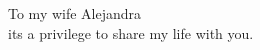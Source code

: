 \thispagestyle{empty}
{}

\vspace*{3cm}

\begin{center}
To my wife Alejandra \\
it\textquotesingle s a privilege to share my life with you.
\end{center}